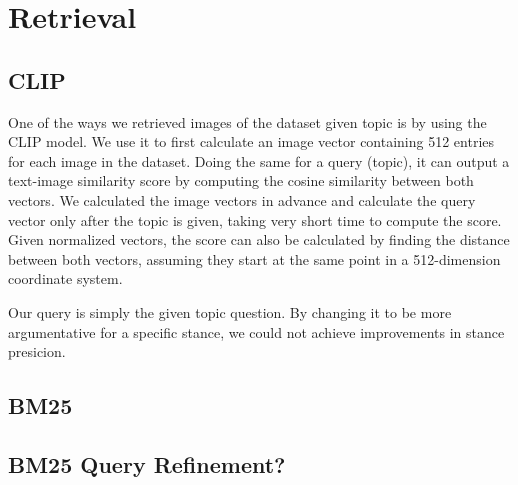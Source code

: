 \section{Retrieval}

\subsection{CLIP}%

One of the ways we retrieved images of the dataset given topic is by using the CLIP model\cite{DBLP:journals/corr/abs-2103-00020}. We use it to first calculate an image vector containing 512 entries for each image in the dataset. Doing the same for a query (topic), it can output a text-image similarity score by computing the cosine similarity between both vectors. We calculated the image vectors in advance and calculate the query vector only after the topic is given, taking very short time to compute the score. Given normalized vectors, the score can also be calculated by finding the distance between both vectors, assuming they start at the same point in a 512-dimension coordinate system.

Our query is simply the given topic question. By changing it to be more argumentative for a specific stance, we could not achieve improvements in stance presicion.

\subsection{BM25}%
\subsection{BM25 Query Refinement?}
